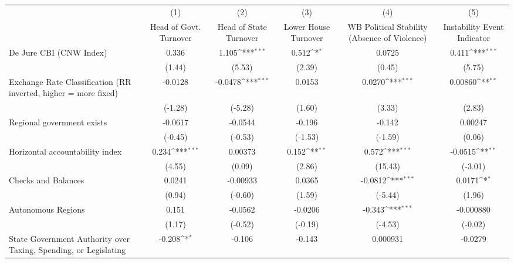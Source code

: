 {
\def\sym#1{\ifmmode^{#1}\else\(^{#1}\)\fi}
\begin{tabular}{l*{5}{c}}
\hline\hline
                &\multicolumn{1}{c}{(1)}&\multicolumn{1}{c}{(2)}&\multicolumn{1}{c}{(3)}&\multicolumn{1}{c}{(4)}&\multicolumn{1}{c}{(5)}\\
                &\multicolumn{1}{c}{Head of Govt. Turnover}&\multicolumn{1}{c}{Head of State Turnover}&\multicolumn{1}{c}{Lower House Turnover}&\multicolumn{1}{c}{WB Political Stability (Absence of Violence)}&\multicolumn{1}{c}{Instability Event Indicator}\\
\hline
De Jure CBI (CNW Index)&    0.336         &    1.105\sym{***}&    0.512\sym{*}  &   0.0725         &    0.411\sym{***}\\
                &   (1.44)         &   (5.53)         &   (2.39)         &   (0.45)         &   (5.75)         \\
[1em]
Exchange Rate Classification (RR inverted, higher = more fixed)&  -0.0128         &  -0.0478\sym{***}&   0.0153         &   0.0270\sym{***}&  0.00860\sym{**} \\
                &  (-1.28)         &  (-5.28)         &   (1.60)         &   (3.33)         &   (2.83)         \\
[1em]
Regional government exists   &  -0.0617         &  -0.0544         &   -0.196         &   -0.142         &  0.00247         \\
                &  (-0.45)         &  (-0.53)         &  (-1.53)         &  (-1.59)         &   (0.06)         \\
[1em]
Horizontal accountability index&    0.234\sym{***}&  0.00373         &    0.152\sym{**} &    0.572\sym{***}&  -0.0515\sym{**} \\
                &   (4.55)         &   (0.09)         &   (2.86)         &  (15.43)         &  (-3.01)         \\
[1em]
Checks and Balances&   0.0241         & -0.00933         &   0.0365         &  -0.0812\sym{***}&   0.0171\sym{*}  \\
                &   (0.94)         &  (-0.60)         &   (1.59)         &  (-5.44)         &   (1.96)         \\
[1em]
Autonomous Regions&    0.151         &  -0.0562         &  -0.0206         &   -0.343\sym{***}&-0.000880         \\
                &   (1.17)         &  (-0.52)         &  (-0.19)         &  (-4.53)         &  (-0.02)         \\
[1em]
State Government Authority over Taxing, Spending, or Legislating&   -0.208\sym{*}  &   -0.106         &   -0.143         & 0.000931         &  -0.0279         \\

\end{tabular}}
